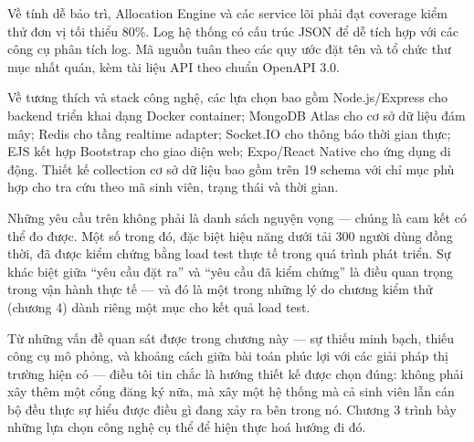 \documentclass[../DoAn.tex]{subfiles}
\begin{document}
Về tính dễ bảo trì, Allocation Engine và các service lõi phải đạt coverage kiểm
thử đơn vị tối thiểu 80\%. Log hệ thống có cấu trúc JSON để dễ tích hợp với các
công cụ phân tích log. Mã nguồn tuân theo các quy ước đặt tên và tổ chức thư
mục nhất quán, kèm tài liệu API theo chuẩn OpenAPI 3.0.

Về tương thích và stack công nghệ, các lựa chọn bao gồm Node.js/Express cho
backend triển khai dạng Docker container; MongoDB Atlas cho cơ sở dữ liệu đám
mây; Redis cho tầng realtime adapter; Socket.IO cho thông báo thời gian thực;
EJS kết hợp Bootstrap cho giao diện web; Expo/React Native cho ứng dụng di
động. Thiết kế collection cơ sở dữ liệu bao gồm trên 19 schema với chỉ mục phù
hợp cho tra cứu theo mã sinh viên, trạng thái và thời gian.

Những yêu cầu trên không phải là danh sách nguyện vọng --- chúng là cam kết có
thể đo được. Một số trong đó, đặc biệt hiệu năng dưới tải 300 người dùng đồng
thời, đã được kiểm chứng bằng load test thực tế trong quá trình phát triển. Sự
khác biệt giữa ``yêu cầu đặt ra'' và ``yêu cầu đã kiểm chứng'' là điều quan
trọng trong vận hành thực tế --- và đó là một trong những lý do chương kiểm thử
(chương 4) dành riêng một mục cho kết quả load test.

Từ những vấn đề quan sát được trong chương này --- sự thiếu minh bạch, thiếu
công cụ mô phỏng, và khoảng cách giữa bài toán phúc lợi với các giải pháp thị
trường hiện có --- điều tôi tin chắc là hướng thiết kế được chọn đúng: không
phải xây thêm một cổng đăng ký nữa, mà xây một hệ thống mà cả sinh viên lẫn
cán bộ đều thực sự hiểu được điều gì đang xảy ra bên trong nó. Chương 3 trình
bày những lựa chọn công nghệ cụ thể để hiện thực hoá hướng đi đó.
\end{document}
